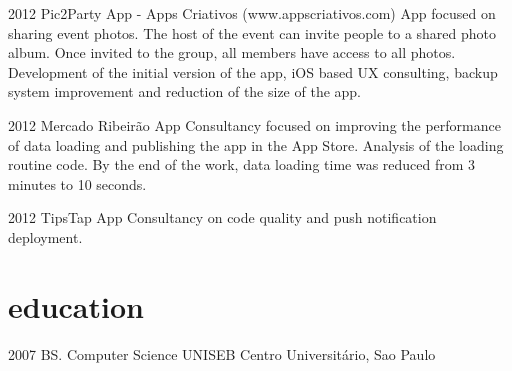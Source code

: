 \documentclass[]{friggeri-cv}
\begin{document}
\begin{entrylist}
    \entry
    {2012}
    {Pic2Party App - Apps Criativos (www.appscriativos.com)}
    {}
    {App focused on sharing event photos. The host of the event can invite people to a shared photo album. Once invited to the group, all members have access to all photos. Development of the initial version of the app, iOS based UX consulting, backup system improvement and reduction of the size of the app.}

    \entry
    {2012}
    {Mercado Ribeirão App}
    {}
    {Consultancy focused on improving the performance of data loading and publishing the app in the App Store. Analysis of the loading routine code. By the end of the work, data loading time was reduced from 3 minutes to 10 seconds.}
    
    \entry
    {2012}
    {TipsTap App}
    {}
    {Consultancy on code quality and push notification deployment.}
    
\end{entrylist}

\section{education}

\begin{entrylist}
  \entry
    {2007}
    {BS. {\normalfont Computer Science}}
    {UNISEB Centro Universitário, Sao Paulo}
    {}
\end{entrylist}
\end{document}
